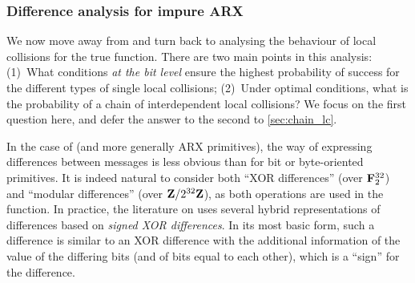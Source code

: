 \subsubsection{Difference analysis for impure ARX}
\label{sec:diffs_ana}
We now move away from \shiun and turn back to analysing the behaviour of local collisions for the true \sha function. There are two main points in this analysis: (1)~What conditions \emph{at the bit level}
ensure the highest probability of success for the different types of single local collisions; (2)~Under optimal conditions, what is the probability of a chain of interdependent local collisions?
We focus on the first question here, and defer the answer to the second to \autoref{sec:chain_lc}.

\medskip

In the case of \sha (and more generally ARX primitives), the way of expressing differences between messages is less obvious than for
\eg{} bit or byte-oriented primitives. It is indeed natural to consider both ``XOR differences'' (over $\mathbf{F}_{2}^{32}$) and
``modular differences'' (over $\mathbf{Z}/2^{32}\mathbf{Z}$), as both operations are used in the function.
In practice, the literature on \sha uses several hybrid representations of differences based on \emph{signed XOR differences}.
In its most basic form, such a difference is similar to an XOR difference with the additional information of the value of the differing bits (and of bits equal to each other),
which is a ``sign'' for the difference.

